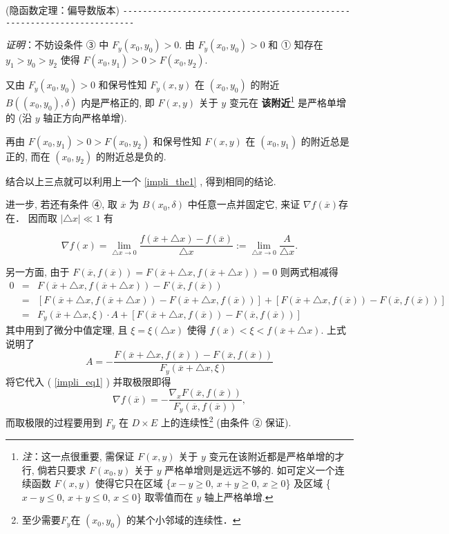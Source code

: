 \begin{theorem}{(隐函数定理：偏导数版本)}
\verb|------------------------------------------------------------------------|

\textsl{证明}：不妨设条件 ③ 中 $F_{y}(x_{0},y_{0})>0.$ 由 $F_{y}(x_{0},y_{0})>0$ 和
① 知存在 $y_{1}>y_{0}>y_{2}$ 使得 $F(x_{0},y_{1})>0>F(x_{0},y_{2})$. 

又由 $F_{y}(x_{0},y_{0})>0$ 和保号性知 $F_{y}(x,y)$ 在 $(x_{0},y_{0})$
的附近 $B((x_{0},y_{0}),\delta)$ 内是严格正的, 即 $F(x,y)$ 关于 $y$ 变元在 \textbf{该附近}\footnote{\textsl{注}：这一点很重要, 需保证 $F(x,y)$ 关于 $y$ 变元在该附近都是严格单增的才行, 倘若只要求 $F(x_{0},y)$
关于 $y$ 严格单增则是远远不够的. 如可定义一个连续函数 $F(x,y)$ 使得它只在区域 \{$x-y\geqslant0$,
$x+y\geqslant0$, $x\geqslant0$\} 及区域 \{$x-y\leqslant0$, $x+y\leqslant0$,
$x\leqslant0$\} 取零值而在 $y$ 轴上严格单增. } 是严格单增的 (沿 $y$ 轴正方向严格单增). 

再由 $F(x_{0},y_{1})>0>F(x_{0},y_{2})$ 和保号性知 $F(x,y)$ 在 $(x_{0},y_{1})$
的附近总是正的, 而在 $(x_{0},y_{2})$ 的附近总是负的. 

结合以上三点就可以利用上一个 \autoref{impli_the1} , 得到相同的结论. 

进一步, 若还有条件 ④, 取 \textbf{$\overline{x}$ }为 $B(x_{0},\delta)$ 中任意一点并固定它, 来证 $\nabla f(\overline{x})$存在． 因而取 $\left|\triangle x\right|\ll1$
有

\begin{equation}\label{impli_eq1}
\nabla f(x)={\displaystyle {\displaystyle \lim_{\triangle x\rightarrow0}}\frac{f(\overline{x}+\triangle x)-f(\overline{x})}{\triangle x}:={\displaystyle \lim_{\triangle x\rightarrow0}}\frac{A}{\triangle x}}.
\end{equation}

另一方面, 由于 $F(\overline{x},f(\overline{x}))=F(\overline{x}+\triangle x,f(\overline{x}+\triangle x))=0$
则两式相减得
$$
\begin{eqnarray*}
0 & = & F(\overline{x}+\triangle x,f(\overline{x}+\triangle x))-F(\overline{x},f(\overline{x}))\\
 & = & \left[F(\overline{x}+\triangle x,f(\overline{x}+\triangle x))-F(\overline{x}+\triangle x,f(\overline{x}))\right]+\left[F(\overline{x}+\triangle x,f(\overline{x}))-F(\overline{x},f(\overline{x}))\right]\\
 & = & F_{y}(\overline{x}+\triangle x,\xi)\cdot A+\left[F(\overline{x}+\triangle x,f(\overline{x}))-F(\overline{x},f(\overline{x}))\right]
\end{eqnarray*}
$$
其中用到了微分中值定理, 且 $\xi=\xi(\triangle x)$ 使得 $f(\overline{x})<\xi<f(\overline{x}+\triangle x)$.
上式说明了 
\[
A=-{\displaystyle \frac{F(\overline{x}+\triangle x,f(\overline{x}))-F(\overline{x},f(\overline{x}))}{F_{y}(\overline{x}+\triangle x,\xi)}}
\]
将它代入 ( \autoref{impli_eq1} ) 并取极限即得 
\begin{equation}\label{impli_eq2}
\nabla f(\overline{x})=-{\displaystyle \frac{\nabla_{x}F(\overline{x},f(\overline{x}))}{F_{y}(\overline{x},f(\overline{x}))},}
\end{equation}
而取极限的过程要用到 $F_{y}$ 在 $D\times E$ 上的连续性\footnote{至少需要$F_y$在 $(x_0,y_0)$ 的某个小邻域的连续性．} (由条件 ② 保证). 


\end{theorem}
